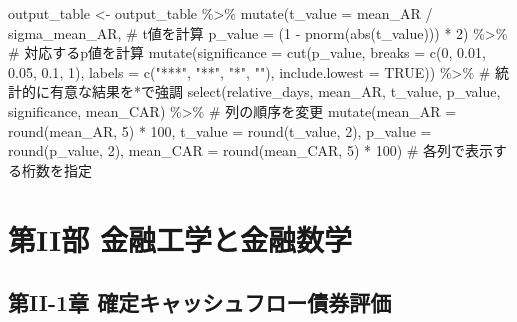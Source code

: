 \documentclass[
  letterpaper,
  DIV=11,
  numbers=noendperiod]{scrreprt}
\newenvironment{Shaded}{\begin{snugshade}}{\end{snugshade}}
\newcommand{\AttributeTok}[1]{\textcolor[rgb]{0.40,0.45,0.13}{#1}}
\newcommand{\CommentTok}[1]{\textcolor[rgb]{0.37,0.37,0.37}{#1}}
\newcommand{\ConstantTok}[1]{\textcolor[rgb]{0.56,0.35,0.01}{#1}}
\newcommand{\DecValTok}[1]{\textcolor[rgb]{0.68,0.00,0.00}{#1}}
\newcommand{\FloatTok}[1]{\textcolor[rgb]{0.68,0.00,0.00}{#1}}
\newcommand{\FunctionTok}[1]{\textcolor[rgb]{0.28,0.35,0.67}{#1}}
\newcommand{\NormalTok}[1]{\textcolor[rgb]{0.00,0.23,0.31}{#1}}
\newcommand{\OtherTok}[1]{\textcolor[rgb]{0.00,0.23,0.31}{#1}}
\newcommand{\SpecialCharTok}[1]{\textcolor[rgb]{0.37,0.37,0.37}{#1}}
\newcommand{\StringTok}[1]{\textcolor[rgb]{0.13,0.47,0.30}{#1}}
\begin{document}
\begin{Shaded}
\begin{Highlighting}[]
\NormalTok{output\_table }\OtherTok{\textless{}{-}}\NormalTok{ output\_table }\SpecialCharTok{\%\textgreater{}\%}
  \FunctionTok{mutate}\NormalTok{(}\AttributeTok{t\_value =}\NormalTok{ mean\_AR }\SpecialCharTok{/}\NormalTok{ sigma\_mean\_AR, }\CommentTok{\# t値を計算}
         \AttributeTok{p\_value =}\NormalTok{ (}\DecValTok{1} \SpecialCharTok{{-}} \FunctionTok{pnorm}\NormalTok{(}\FunctionTok{abs}\NormalTok{(t\_value))) }\SpecialCharTok{*} \DecValTok{2}\NormalTok{) }\SpecialCharTok{\%\textgreater{}\%} \CommentTok{\# 対応するp値を計算}
  \FunctionTok{mutate}\NormalTok{(}\AttributeTok{significance =} \FunctionTok{cut}\NormalTok{(p\_value, }
                            \AttributeTok{breaks =} \FunctionTok{c}\NormalTok{(}\DecValTok{0}\NormalTok{, }\FloatTok{0.01}\NormalTok{, }\FloatTok{0.05}\NormalTok{, }\FloatTok{0.1}\NormalTok{, }\DecValTok{1}\NormalTok{), }
                            \AttributeTok{labels =} \FunctionTok{c}\NormalTok{(}\StringTok{"***"}\NormalTok{, }\StringTok{"**"}\NormalTok{, }\StringTok{"*"}\NormalTok{, }\StringTok{""}\NormalTok{), }
                            \AttributeTok{include.lowest =} \ConstantTok{TRUE}\NormalTok{)) }\SpecialCharTok{\%\textgreater{}\%} \CommentTok{\# 統計的に有意な結果を*で強調}
  \FunctionTok{select}\NormalTok{(relative\_days, mean\_AR, t\_value, p\_value, significance, mean\_CAR) }\SpecialCharTok{\%\textgreater{}\%} \CommentTok{\# 列の順序を変更}
  \FunctionTok{mutate}\NormalTok{(}\AttributeTok{mean\_AR =} \FunctionTok{round}\NormalTok{(mean\_AR, }\DecValTok{5}\NormalTok{) }\SpecialCharTok{*} \DecValTok{100}\NormalTok{, }
         \AttributeTok{t\_value =} \FunctionTok{round}\NormalTok{(t\_value, }\DecValTok{2}\NormalTok{), }
         \AttributeTok{p\_value =} \FunctionTok{round}\NormalTok{(p\_value, }\DecValTok{2}\NormalTok{), }
         \AttributeTok{mean\_CAR =} \FunctionTok{round}\NormalTok{(mean\_CAR, }\DecValTok{5}\NormalTok{) }\SpecialCharTok{*} \DecValTok{100}\NormalTok{) }\CommentTok{\# 各列で表示する桁数を指定}
\end{Highlighting}
\end{Shaded}

\part{第II部 金融工学と金融数学}

\chapter{第II-1章
確定キャッシュフロー債券評価}\label{ux7b2cii-1ux7ae0-ux78baux5b9aux30adux30e3ux30c3ux30b7ux30e5ux30d5ux30edux30fcux50b5ux5238ux8a55ux4fa1}
\end{document}
